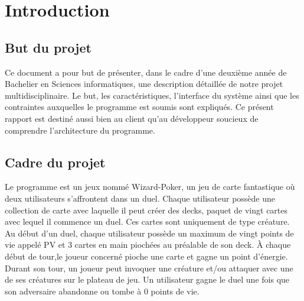 \chapter{Introduction}
\section{But du projet}
Ce document a pour but de présenter, dans le cadre d'une deuxième année de Bachelier en Sciences informatiques, une description détaillée de notre projet multidisciplinaire. Le but, les caractéristiques, l'interface du système ainsi que les contraintes auxquelles le programme est soumis sont expliqués. Ce présent rapport est destiné aussi bien au client qu'au développeur soucieux de comprendre l'architecture du programme.
\section{Cadre du projet}
Le programme est un jeux nommé Wizard-Poker, un jeu de carte fantastique où deux utilisateurs s'affrontent dans un duel. Chaque utilisateur possède une collection de carte avec laquelle il peut créer des decks, paquet de vingt cartes avec lequel il commence un duel. Ces cartes sont uniquement de type créature.\\
Au début d'un duel, chaque utilisateur possède un maximum de vingt points de vie  appelé PV et 3 cartes en main piochées au préalable de son deck. À chaque début de tour,le joueur concerné pioche une carte et gagne un point d'énergie. Durant son tour, un joueur peut invoquer une créature et/ou attaquer avec une de ses créatures sur le plateau de jeu. Un utilisateur gagne le duel une fois que son adversaire abandonne ou tombe à 0 points de vie.